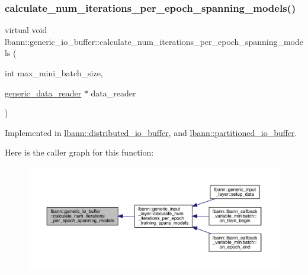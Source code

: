 \subsubsection{\texorpdfstring{calculate\+\_\+num\+\_\+iterations\+\_\+per\+\_\+epoch\+\_\+spanning\+\_\+models()}{calculate\_num\_iterations\_per\_epoch\_spanning\_models()}}
{\footnotesize\ttfamily virtual void lbann\+::generic\+\_\+io\+\_\+buffer\+::calculate\+\_\+num\+\_\+iterations\+\_\+per\+\_\+epoch\+\_\+spanning\+\_\+models (\begin{DoxyParamCaption}\item[{int}]{max\+\_\+mini\+\_\+batch\+\_\+size,  }\item[{\hyperlink{classlbann_1_1generic__data__reader}{generic\+\_\+data\+\_\+reader} $\ast$}]{data\+\_\+reader }\end{DoxyParamCaption})\hspace{0.3cm}{\ttfamily [pure virtual]}}



Implemented in \hyperlink{classlbann_1_1distributed__io__buffer_aa1f5200f9646d38fe3b3adaf39645330}{lbann\+::distributed\+\_\+io\+\_\+buffer}, and \hyperlink{classlbann_1_1partitioned__io__buffer_a50b6e2b7a82927526758f7cfb18a1ded}{lbann\+::partitioned\+\_\+io\+\_\+buffer}.

Here is the caller graph for this function\+:\nopagebreak
\begin{figure}[H]
\begin{center}
\leavevmode
\includegraphics[width=350pt]{classlbann_1_1generic__io__buffer_ac943184cf364f7922648e3acb760b41e_icgraph}
\end{center}
\end{figure}
\mbox{\label{classlbann_1_1generic__io__buffer_affc26b29e3f9eaaae5c033648e1a0141}} 
